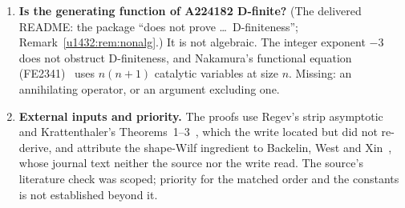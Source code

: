 \documentclass[11pt]{article}
\theoremstyle{remark}\newtheorem{remark}[theorem]{Remark}
\begin{document}
\begin{enumerate}
\item\label{u1432:q:dfinite} \textbf{Is the generating function of A224182
 D-finite?} (The delivered README: the package ``does not prove \dots\
 D-finiteness''; Remark~\ref{u1432:rem:nonalg}.) It is not algebraic. The integer
 exponent $-3$ does not obstruct D-finiteness, and Nakamura's functional
 equation (FE2341)~\cite{Nakamura} uses $n(n+1)$ catalytic variables at
 size $n$.
 Missing: an annihilating operator, or an argument excluding one.
\item\label{u1432:q:external} \textbf{External inputs and priority.} The
 proofs use Regev's strip asymptotic~\cite{Regev} and Krattenthaler's
 Theorems~1--3~\cite{Kratt}, which the write located but did not re-derive,
 and attribute the shape-Wilf ingredient to Backelin, West and
 Xin~\cite{BWX}, whose journal text neither the source nor the write read.
 The source's literature check was scoped; priority for the matched order and
 the constants is not established beyond it.
\end{enumerate}
\end{document}
